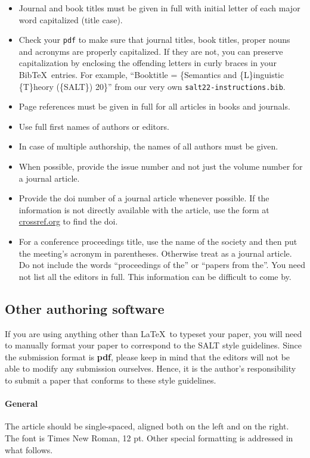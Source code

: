 \documentclass{salt}
\newcommand{\BibTeX}{{\sc Bib}\TeX }
\begin{document}
\begin{itemize}
\item Journal and book titles must be given in full with initial letter of each major word capitalized (title case).
\item Check your \verb+pdf+ to make sure that journal titles, book titles, proper nouns and acronyms are properly capitalized. If they are not, you can preserve capitalization by enclosing the offending letters in curly braces in your \BibTeX\ entries. For example, ``Booktitle = \{Semantics and \{L\}inguistic \{T\}heory (\{SALT\}) 20\}'' from our very own \verb+salt22-instructions.bib+.
\item Page references must be given in full for all articles in books and journals.
\item Use full first names of authors or editors.
\item In case of multiple authorship, the names of all authors must be given.
\item When possible, provide the issue number and not just the volume number for a journal article.
\item Provide the doi number of a journal article whenever possible.  If the information is not directly available with the article, use the form at \href{http://crossref.org}{crossref.org} to find the doi.
\item For a conference proceedings title, use the name of the society and then put the meeting's acronym in parentheses.  Otherwise treat as a journal article. Do not include the words ``proceedings of the'' or ``papers from the''.  You need not list all the editors in full. This information can be difficult to come by.
\end{itemize}

\subsection{Other authoring software} \label{sec:other-auth-softw}
If you are using anything other than \LaTeX\ to typeset your paper, you will need to manually format your paper to correspond to the SALT style guidelines. Since the submission format is \textbf{pdf}, please keep in mind that the editors will not be able to modify any submission ourselves. Hence, it is the author's responsibility to submit a paper that conforms to these style guidelines.

\paragraph{General}
The article should be single-spaced, aligned both on the left and on the right. The font is Times New Roman, 12 pt. Other special formatting is addressed in what follows.
\end{document}
